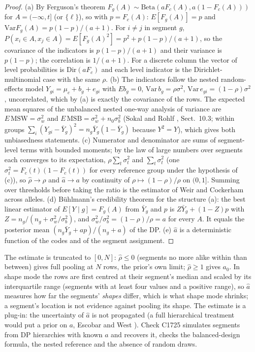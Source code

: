 \begin{proof}
(a) By Ferguson's theorem \cite{ferguson} $F_g(A)\sim\mathrm{Beta}(aF_c(A),a(1-F_c(A)))$ for $A=(-\infty,t]$ (or $\{\ell\}$), so with $p=F_c(A)$: $E[F_g(A)]=p$ and $\mathrm{Var}F_g(A)=p(1-p)/(a+1)$. For $i\ne j$ in segment $g$, $P(x_i\in A,x_j\in A)=E[F_g(A)^2]=p^2+p(1-p)/(a+1)$, so the covariance of the indicators is $p(1-p)/(a+1)$ and their variance is $p(1-p)$; the correlation is $1/(a+1)$. For a discrete column the vector of level probabilities is $\mathrm{Dir}(aF_c)$ and each level indicator is the Dirichlet-multinomial case \cite{mosimann1962} with the same $\rho$. (b) The indicators follow the nested random-effects model $Y_{gi}=\mu_c+b_g+e_{gi}$ with $E b_g=0$, $\mathrm{Var}\,b_g=\rho\sigma^2$, $\mathrm{Var}\,e_{gi}=(1-\rho)\sigma^2$, uncorrelated, which by (a) is exactly the covariance of the rows. The expected mean squares of the unbalanced nested one-way analysis of variance are $E\,\mathrm{MSW}=\sigma^2_w$ and $E\,\mathrm{MSB}=\sigma^2_w+n_0\sigma^2_b$ (Sokal and Rohlf \cite{sokalrohlf}, Sect.~10.3; within groups $\sum_i(Y_{gi}-\bar Y_g)^2=n_g\bar Y_g(1-\bar Y_g)$ because $Y^2=Y$), which gives both unbiasedness statements. (c) Numerator and denominator are sums of segment-level terms with bounded moments; by the law of large numbers over segments each converges to its expectation, $\rho\sum_t\sigma^2_t$ and $\sum_t\sigma^2_t$ (one $\sigma^2_t=F_c(t)(1-F_c(t))$ for every reference group under the hypothesis of (c)), so $\hat\rho\to\rho$ and $\hat a\to a$ by continuity of $\rho\mapsto(1-\rho)/\rho$ on $(0,1]$. Summing over thresholds before taking the ratio is the estimator of Weir and Cockerham \cite{weircockerham1984} across alleles. (d) Bühlmann's credibility theorem \cite{buhlmann1967,buhlmannstraub1970} for the structure (a): the best linear estimator of $E[Y\mid g]=F_g(A)$ from $\bar Y_g$ and $p$ is $Z\bar Y_g+(1-Z)p$ with $Z=n_g/(n_g+\sigma^2_w/\sigma^2_b)$, and $\sigma^2_w/\sigma^2_b=(1-\rho)/\rho=a$ for every $A$. It equals the posterior mean $(n_g\bar Y_g+ap)/(n_g+a)$ of the DP. (e) $\hat a$ is a deterministic function of the codes and of the segment assignment.
\end{proof}
\noindent The estimate is truncated to $[0,N]$: $\hat\rho\le0$ (segments no more alike within than between) gives full pooling at $N$ rows, the prior's own limit; $\hat\rho\ge1$ gives $a_0$. In shape mode the rows are first centred at their segment's median and scaled by its interquartile range (segments with at least four values and a positive range), so $\hat a$ measures how far the segments' \emph{shapes} differ, which is what shape mode shrinks; a segment's location is not evidence against pooling its shape. The estimate is a plug-in: the uncertainty of $\hat a$ is not propagated (a full hierarchical treatment would put a prior on $a$, Escobar and West \cite{escobarwest1995}). Check C1725 simulates segments from DP hierarchies with known $a$ and recovers it, checks the balanced-design formula, the nested reference and the absence of random draws.

